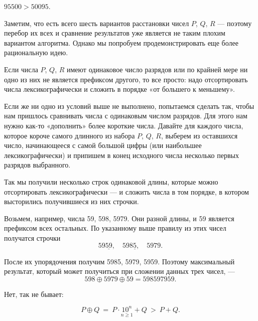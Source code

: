 ﻿
\begin{itemize}
\itA $95500 > 50095$.

\itB Заметим, что есть всего шесть вариантов расстановки чисел $P$, $Q$, $R$ — поэтому перебор их всех и сравнение результатов уже является не таким плохим вариантом алгоритма. Однако мы попробуем продемонстрировать еще более рациональную идею.

Если числа $P$, $Q$, $R$ имеют одинаковое число разрядов или по крайней мере ни одно из них не является префиксом другого, то все просто: надо отсортировать числа лексикографически и сложить в порядке «от большего к меньшему».

Если же ни одно из условий выше не выполнено, попытаемся сделать так, чтобы нам пришлось сравнивать числа с одинаковым числом разрядов. Для этого нам нужно как-то «дополнить» более короткие числа. Давайте для каждого числа, которое короче самого длинного из набора $P$, $Q$, $R$, выберем из оставшихся число, начинающееся с самой большой цифры (или наибольшее лексикографически) и припишем в конец исходного числа несколько первых разрядов выбранного.

Так мы получили несколько строк одинаковой длины, которые можно отсортировать лексикографически — и сложить числа в том порядке, в котором высторились получившиеся из них строчки.

Возьмем, например, числа 59, 598, 5979. Они разной длины, и 59 является префиксом всех остальных. По указанному выше правилу из этих чисел получатся строчки
	$$59\underline{59},\quad 598\underline{5},\quad 5979.$$

После их упорядочения получим 5985, 5979, 5959. Поэтому максимальный результат, который может получиться при сложении данных трех чисел, —
	$$598 \oplus 5979 \oplus 59 = 598597959.$$

\itC Нет, так не бывает:

$$P \oplus Q\ =\ P \cdot \underset{n\geq1}{10^n} + Q\ >\ P+Q.$$
\end{itemize}